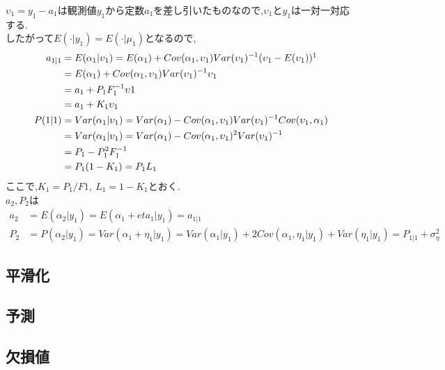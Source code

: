 \documentclass[uplatex]{jsarticle}
\begin{document}
$\upsilon_{1}=y_{1}-a_{1}$は観測値$y_{1}$から定数$a_{1}$を差し引いたものなので,$\upsilon_{1}$と$y_{1}$は一対一対応する.\\
したがって$E(\cdot|y_{1})=E(\cdot|\mu_{1})$となるので,
\begin{align*}
  a_{1|1}&=E(\alpha_{1}|\upsilon_{1})=E(\alpha_{1})+Cov(\alpha_{1},\upsilon_{1})Var(\upsilon_{1})^{-1}(\upsilon_{1}-E(\upsilon_{1}))\footnotemark[1]\\
		 &=E(\alpha_{1})+Cov(\alpha_{1},\upsilon_{1})Var(\upsilon_{1})^{-1}\upsilon_{1}\\
		 &=a_{1}+P_{1}F_{1}^{-1}\upsilon{1}\\
		 &=a_{1}+K_{1}\upsilon_{1}\\
  P(1|1)&=Var(\alpha_{1}|\upsilon_{1})=Var(\alpha_{1})-Cov(\alpha_{1},\upsilon_{1})Var(\upsilon_{1})^{-1}Cov(\upsilon_{1},\alpha_{1})\\
		&=Var(\alpha_{1}|\upsilon_{1})=Var(\alpha_{1})-Cov(\alpha_{1},\upsilon_{1})^{2}Var(\upsilon_{1})^{-1}\\
		&=P_{1}-P_{1}^{2}F_{1}^{-1}\\
		&=P_{1}(1-K_{1})=P_{1}L_{1}
\end{align*}
ここで,$K_{1}=P_{1}/F{1},\ L_{1}=1-K_{1}$とおく.\\
$a_{2},P_{2}$は
\begin{align*}
  a_{2}&=E(\alpha_{2}|y_{1})=E(\alpha_{1}+eta_{1}|y_{1})=a_{1|1}\\
  P_{2}&=P(\alpha_{2}|y_{1})=Var(\alpha_{1}+\eta_{1}|y_{1})=Var(\alpha_{1}|y_{1})+2Cov(\alpha_{1},\eta_{1}|y_{1})+Var(\eta_{1}|y_{1})=P_{1|1}+\sigma_{\eta}^{2}
\end{align*}
\subsection{平滑化}
\subsection{予測}
\subsection{欠損値}
\end{document}
